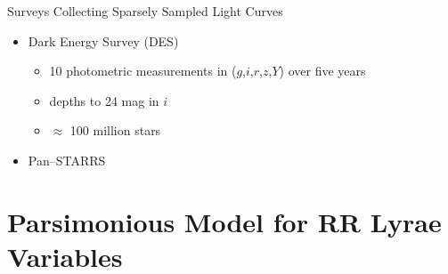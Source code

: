 \documentclass[12pt]{beamer}
\begin{document}
\begin{frame}{Surveys Collecting Sparsely Sampled Light Curves}

\begin{itemize}
\item Dark Energy Survey (DES)
\begin{itemize}
\item 10 photometric measurements in ($g$,$i$,$r$,$z$,$Y$) over five years
\item depths to 24 mag in $i$
\item $\approx$ 100 million stars
\end{itemize}
\item Pan--STARRS
\end{itemize}
\end{frame}





\section{Parsimonious Model for RR Lyrae Variables}






\end{document}
